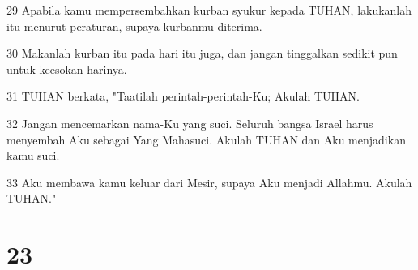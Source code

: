 \par 29 Apabila kamu mempersembahkan kurban syukur kepada TUHAN, lakukanlah itu menurut peraturan, supaya kurbanmu diterima.
\par 30 Makanlah kurban itu pada hari itu juga, dan jangan tinggalkan sedikit pun untuk keesokan harinya.
\par 31 TUHAN berkata, "Taatilah perintah-perintah-Ku; Akulah TUHAN.
\par 32 Jangan mencemarkan nama-Ku yang suci. Seluruh bangsa Israel harus menyembah Aku sebagai Yang Mahasuci. Akulah TUHAN dan Aku menjadikan kamu suci.
\par 33 Aku membawa kamu keluar dari Mesir, supaya Aku menjadi Allahmu. Akulah TUHAN."

\chapter{23}

